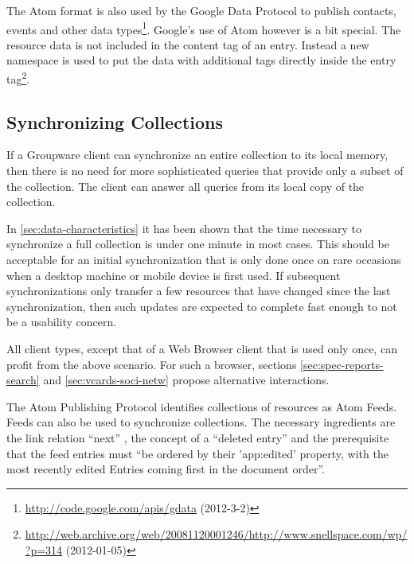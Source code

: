 \documentclass[11pt,a4paper,headsepline,twoside]{scrartcl}		%
\newcommand{\citeurl}[2]{\url{#1} (#2)}
\begin{document}
The Atom format is also used by the Google Data Protocol to publish contacts,
events and other data
types\footnote{\citeurl{http://code.google.com/apis/gdata}{2012-3-2}}. Google's
use of Atom however is a bit special. The resource data is not included in the
content tag of an entry. Instead a new namespace is used to put the data with
additional tags directly inside the entry
tag\footnote{\citeurl{http://web.archive.org/web/20081120001246/http://www.snellspace.com/wp/?p=314}{2012-01-05}}.


\subsection{Synchronizing Collections}
\label{sec:synchr-coll}

If a Groupware client can synchronize an entire collection to its local memory,
then there is no need for more sophisticated queries that provide only a subset
of the collection. The client can answer all queries from its local copy of the
collection.

In \autoref{sec:data-characteristics} it has been shown that the time necessary
to synchronize a full collection is under one minute in most cases. This should
be acceptable for an initial synchronization that is only done once on rare
occasions when a desktop machine or mobile device is first used. If subsequent
synchronizations only transfer a few resources that have changed since the last
synchronization, then such updates are expected to complete fast enough to not
be a usability concern.

All client types, except that of a Web Browser client that is used only once,
can profit from the above scenario. For such a browser, sections
\ref{sec:spec-reports-search} and \ref{sec:vcards-soci-netw} propose alternative
interactions.

The Atom Publishing Protocol identifies collections of resources as Atom
Feeds. Feeds can also be used to synchronize collections. The necessary
ingredients are the link relation ``next'' \cite{RFC5005}, the concept of a
``deleted entry'' \cite{draft-snell-atompub-tombstones-14} and the prerequisite
that the feed entries must ``be ordered by their 'app:edited' property, with the
most recently edited Entries coming first in the document
order''\cite[sec. 10]{RFC5023}.
\end{document}
